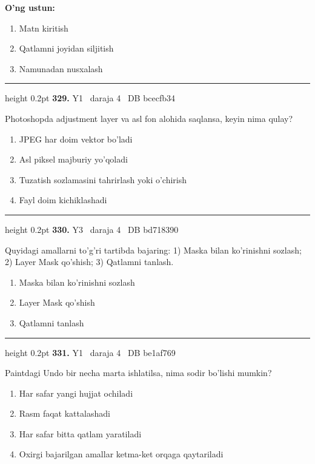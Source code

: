 \documentclass[10pt,a4paper,oneside]{article}
\begin{document}
\textbf{\footnotesize O'ng ustun:}
\begin{enumerate}[label=\Alph*),leftmargin=9mm]
\item Matn kiritish
\item Qatlamni joyidan siljitish
\item Namunadan nusxalash
\end{enumerate}
\vspace{2mm}\hrule height 0.2pt \vspace{4mm}
\hypertarget{q329}{\textbf{\color{ink}329.}}  {\color{muted}\scriptsize Y1 \textbullet\ daraja 4 \textbullet\ DB bcecfb34}
\par
Photoshopda adjustment layer va asl fon alohida saqlansa, keyin nima qulay?
\begin{enumerate}[label=\Alph*),leftmargin=9mm]
\item JPEG har doim vektor bo'ladi
\item Asl piksel majburiy yo'qoladi
\item Tuzatish sozlamasini tahrirlash yoki o'chirish
\item Fayl doim kichiklashadi
\end{enumerate}
\vspace{2mm}\hrule height 0.2pt \vspace{4mm}
\hypertarget{q330}{\textbf{\color{ink}330.}}  {\color{muted}\scriptsize Y3 \textbullet\ daraja 4 \textbullet\ DB bd718390}
\par
Quyidagi amallarni to'g'ri tartibda bajaring: 1) Maska bilan ko'rinishni sozlash; 2) Layer Mask qo'shish; 3) Qatlamni tanlash.
\begin{enumerate}[label=\Alph*),leftmargin=9mm]
\item Maska bilan ko'rinishni sozlash
\item Layer Mask qo'shish
\item Qatlamni tanlash
\end{enumerate}
\vspace{2mm}\hrule height 0.2pt \vspace{4mm}
\hypertarget{q331}{\textbf{\color{ink}331.}}  {\color{muted}\scriptsize Y1 \textbullet\ daraja 4 \textbullet\ DB be1af769}
\par
Paintdagi Undo bir necha marta ishlatilsa, nima sodir bo'lishi mumkin?
\begin{enumerate}[label=\Alph*),leftmargin=9mm]
\item Har safar yangi hujjat ochiladi
\item Rasm faqat kattalashadi
\item Har safar bitta qatlam yaratiladi
\item Oxirgi bajarilgan amallar ketma-ket orqaga qaytariladi
\end{enumerate}
\end{document}
